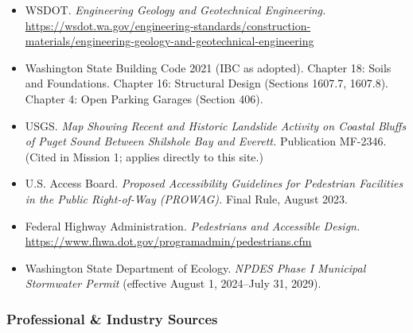 \documentclass[11pt,letterpaper]{article}
\begin{document}
\begin{itemize}
  \item WSDOT. \textit{Engineering Geology and Geotechnical Engineering.} \url{https://wsdot.wa.gov/engineering-standards/construction-materials/engineering-geology-and-geotechnical-engineering}
  \item Washington State Building Code 2021 (IBC as adopted). Chapter 18: Soils and Foundations. Chapter 16: Structural Design (Sections 1607.7, 1607.8). Chapter 4: Open Parking Garages (Section 406).
  \item USGS. \textit{Map Showing Recent and Historic Landslide Activity on Coastal Bluffs of Puget Sound Between Shilshole Bay and Everett.} Publication MF-2346. (Cited in Mission 1; applies directly to this site.)
  \item U.S. Access Board. \textit{Proposed Accessibility Guidelines for Pedestrian Facilities in the Public Right-of-Way (PROWAG).} Final Rule, August 2023.
  \item Federal Highway Administration. \textit{Pedestrians and Accessible Design.} \url{https://www.fhwa.dot.gov/programadmin/pedestrians.cfm}
  \item Washington State Department of Ecology. \textit{NPDES Phase I Municipal Stormwater Permit} (effective August 1, 2024--July 31, 2029).
\end{itemize}

\subsubsection{Professional \& Industry Sources}
\end{document}
